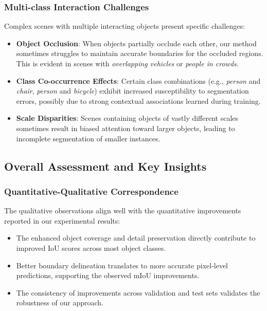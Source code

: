 \subsubsection{Multi-class Interaction Challenges}
\label{subsubsec:multiclass_challenges}

Complex scenes with multiple interacting objects present specific challenges:

\begin{itemize}
    \item \textbf{Object Occlusion}: When objects partially occlude each other, our method sometimes struggles to maintain accurate boundaries for the occluded regions. This is evident in scenes with \textit{overlapping vehicles} or \textit{people in crowds}.
    
    \item \textbf{Class Co-occurrence Effects}: Certain class combinations (e.g., \textit{person} and \textit{chair}, \textit{person} and \textit{bicycle}) exhibit increased susceptibility to segmentation errors, possibly due to strong contextual associations learned during training.
    
    \item \textbf{Scale Disparities}: Scenes containing objects of vastly different scales sometimes result in biased attention toward larger objects, leading to incomplete segmentation of smaller instances.
\end{itemize}

\subsection{Overall Assessment and Key Insights}
\label{subsec:overall_assessment}

\subsubsection{Quantitative-Qualitative Correspondence}
\label{subsubsec:quant_qual_correspondence}

The qualitative observations align well with the quantitative improvements reported in our experimental results:

\begin{itemize}
    \item The enhanced object coverage and detail preservation directly contribute to improved IoU scores across most object classes.
    \item Better boundary delineation translates to more accurate pixel-level predictions, supporting the observed mIoU improvements.
    \item The consistency of improvements across validation and test sets validates the robustness of our approach.
\end{itemize}

